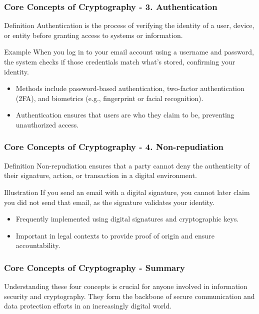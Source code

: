\documentclass{beamer}
\begin{document}
\begin{frame}[fragile]
    \frametitle{Core Concepts of Cryptography - 3. Authentication}
    \begin{block}{Definition}
        Authentication is the process of verifying the identity of a user, device, or entity before granting access to systems or information.
    \end{block}
    
    \begin{block}{Example}
        When you log in to your email account using a username and password, the system checks if those credentials match what’s stored, confirming your identity.
    \end{block}
    
    \begin{itemize}
        \item Methods include password-based authentication, two-factor authentication (2FA), and biometrics (e.g., fingerprint or facial recognition).
        \item Authentication ensures that users are who they claim to be, preventing unauthorized access.
    \end{itemize}
\end{frame}

\begin{frame}[fragile]
    \frametitle{Core Concepts of Cryptography - 4. Non-repudiation}
    \begin{block}{Definition}
        Non-repudiation ensures that a party cannot deny the authenticity of their signature, action, or transaction in a digital environment.
    \end{block}
    
    \begin{block}{Illustration}
        If you send an email with a digital signature, you cannot later claim you did not send that email, as the signature validates your identity.
    \end{block}
    
    \begin{itemize}
        \item Frequently implemented using digital signatures and cryptographic keys.
        \item Important in legal contexts to provide proof of origin and ensure accountability.
    \end{itemize}
\end{frame}

\begin{frame}[fragile]
    \frametitle{Core Concepts of Cryptography - Summary}
    Understanding these four concepts is crucial for anyone involved in information security and cryptography. 
    They form the backbone of secure communication and data protection efforts in an increasingly digital world. 
\end{frame}
\end{document}
